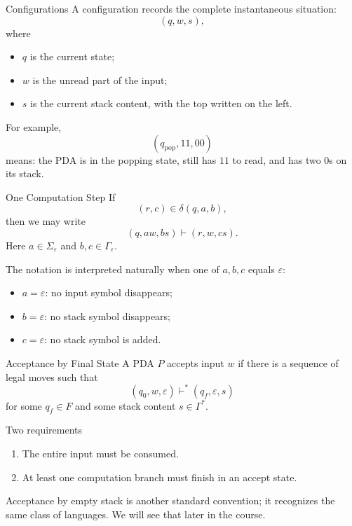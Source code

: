 \documentclass[aspectratio=169,10pt]{beamer}
\newcommand{\eps}{\varepsilon}
\newcommand{\turn}{\vdash}
\newcommand{\turns}{\vdash^{*}}
\begin{document}
\begin{frame}{Configurations}
A configuration records the complete instantaneous situation:
\[
(q,w,s),
\]
where
\begin{itemize}
    \item $q$ is the current state;
    \item $w$ is the unread part of the input;
    \item $s$ is the current stack content, with the top written on the left.
\end{itemize}

\vspace{0.6em}
For example,
\[
(q_{\mathrm{pop}},11,00)
\]
means: the PDA is in the popping state, still has $11$ to read, and has two $0$s on its stack.
\end{frame}

\begin{frame}{One Computation Step}
If
\[
(r,c)\in\delta(q,a,b),
\]
then we may write
\[
(q,aw,bs)\turn(r,w,cs).
\]
Here $a\in\Sigma_{\eps}$ and $b,c\in\Gamma_{\eps}$.

\vspace{0.8em}
The notation is interpreted naturally when one of $a,b,c$ equals $\eps$:

\begin{itemize}
    \item $a=\eps$: no input symbol disappears;
    \item $b=\eps$: no stack symbol disappears;
    \item $c=\eps$: no stack symbol is added.
\end{itemize}
\end{frame}

\begin{frame}{Acceptance by Final State}
A PDA $P$ accepts input $w$ if there is a sequence of legal moves such that
\[
(q_0,w,\eps)\turns(q_f,\eps,s)
\]
for some $q_f\in F$ and some stack content $s\in\Gamma^{*}$.

\vspace{0.8em}
\begin{exampleblock}{Two requirements}
\begin{enumerate}
    \item The entire input must be consumed.
    \item At least one computation branch must finish in an accept state.
\end{enumerate}
\end{exampleblock}

\vspace{0.4em}
Acceptance by empty stack is another standard convention; it recognizes the same class of languages. We will see that later in the course.
\end{frame}
\end{document}
